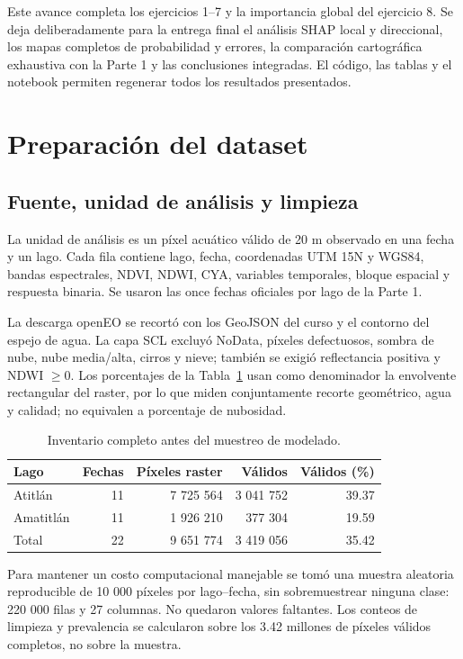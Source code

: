 \documentclass[11pt,letterpaper]{article}
\begin{document}
Este avance completa los ejercicios 1--7 y la importancia global del ejercicio 8. Se deja deliberadamente para la entrega final el análisis SHAP local y direccional, los mapas completos de probabilidad y errores, la comparación cartográfica exhaustiva con la Parte 1 y las conclusiones integradas. El código, las tablas y el notebook permiten regenerar todos los resultados presentados.

\section{Preparación del dataset}

\subsection{Fuente, unidad de análisis y limpieza}

La unidad de análisis es un píxel acuático válido de 20 m observado en una fecha y un lago. Cada fila contiene lago, fecha, coordenadas UTM 15N y WGS84, bandas espectrales, NDVI, NDWI, CYA, variables temporales, bloque espacial y respuesta binaria. Se usaron las once fechas oficiales por lago de la Parte 1.

La descarga openEO se recortó con los GeoJSON del curso y el contorno del espejo de agua. La capa SCL excluyó NoData, píxeles defectuosos, sombra de nube, nube media/alta, cirros y nieve; también se exigió reflectancia positiva y NDWI $\geq 0$. Los porcentajes de la Tabla~\ref{tab:limpieza} usan como denominador la envolvente rectangular del raster, por lo que miden conjuntamente recorte geométrico, agua y calidad; no equivalen a porcentaje de nubosidad.

\begin{table}[H]
\centering
\caption{Inventario completo antes del muestreo de modelado.}
\label{tab:limpieza}
\begin{tabular}{lrrrr}
\toprule
Lago & Fechas & Píxeles raster & Válidos & Válidos (\%)\\
\midrule
Atitlán & 11 & 7 725 564 & 3 041 752 & 39.37\\
Amatitlán & 11 & 1 926 210 & 377 304 & 19.59\\
\midrule
Total & 22 & 9 651 774 & 3 419 056 & 35.42\\
\bottomrule
\end{tabular}
\end{table}

Para mantener un costo computacional manejable se tomó una muestra aleatoria reproducible de 10 000 píxeles por lago--fecha, sin sobremuestrear ninguna clase: 220 000 filas y 27 columnas. No quedaron valores faltantes. Los conteos de limpieza y prevalencia se calcularon sobre los 3.42 millones de píxeles válidos completos, no sobre la muestra.
\end{document}
